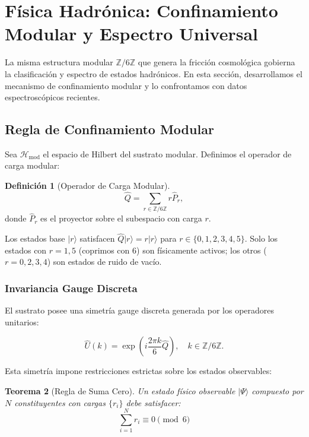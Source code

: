 \documentclass[11pt, a4paper]{article}
\theoremstyle{plain}
\newtheorem{teorema}{Teorema}[section]
\theoremstyle{definition}
\newtheorem{definicion}[teorema]{Definición}
\newcommand{\Zmod}{\mathbb{Z}/6\mathbb{Z}}
\newcommand{\Hmod}{\mathcal{H}_{\text{mod}}}
\begin{document}

\section{Física Hadrónica: Confinamiento Modular y Espectro Universal}
\label{sec:hadrones}

La misma estructura modular $\Zmod$ que genera la fricción cosmológica gobierna la clasificación y espectro de estados hadrónicos. En esta sección, desarrollamos el mecanismo de confinamiento modular y lo confrontamos con datos espectroscópicos recientes.

\subsection{Regla de Confinamiento Modular}

Sea $\Hmod$ el espacio de Hilbert del sustrato modular. Definimos el operador de carga modular:

\begin{definicion}[Operador de Carga Modular]
\begin{equation}
\hat{Q} = \sum_{r \in \Zmod} r \hat{P}_r,
\end{equation}
donde $\hat{P}_r$ es el proyector sobre el subespacio con carga $r$.
\end{definicion}

Los estados base $|r\rangle$ satisfacen $\hat{Q}|r\rangle = r|r\rangle$ para $r \in \{0,1,2,3,4,5\}$. Solo los estados con $r=1,5$ (coprimos con 6) son físicamente activos; los otros ($r=0,2,3,4$) son estados de ruido de vacío.

\subsubsection{Invariancia Gauge Discreta}

El sustrato posee una simetría gauge discreta generada por los operadores unitarios:

\begin{equation}
\hat{U}(k) = \exp\left(i\frac{2\pi k}{6}\hat{Q}\right), \quad k \in \Zmod.
\end{equation}

Esta simetría impone restricciones estrictas sobre los estados observables:

\begin{teorema}[Regla de Suma Cero]
Un estado físico observable $|\Psi\rangle$ compuesto por $N$ constituyentes con cargas $\{r_i\}$ debe satisfacer:
\begin{equation}
\sum_{i=1}^N r_i \equiv 0 \pmod{6}
\label{eq:zero_sum_rule}
\end{equation}
\end{teorema}
\end{document}

